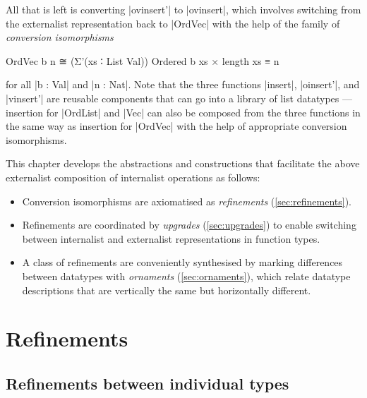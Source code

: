 All that is left is converting |ovinsert'| to |ovinsert|, which involves switching from the externalist representation back to |OrdVec| with the help of the family of \emph{conversion isomorphisms}
\begin{code}
OrdVec b n ≅ (Σ'(xs ∶ List Val)) Ordered b xs × length xs ≡ n
\end{code}
for all |b : Val| and |n : Nat|.
Note that the three functions |insert|, |oinsert'|, and |vinsert'| are reusable components that can go into a library of list datatypes --- insertion for |OrdList| and |Vec| can also be composed from the three functions in the same way as insertion for |OrdVec| with the help of appropriate conversion isomorphisms.

This chapter develops the abstractions and constructions that facilitate the above externalist composition of internalist operations as follows:
\begin{itemize}
\item Conversion isomorphisms are axiomatised as \emph{refinements} (\autoref{sec:refinements}).
\item Refinements are coordinated by \emph{upgrades} (\autoref{sec:upgrades}) to enable switching between internalist and externalist representations in function types.
\item A class of refinements are conveniently synthesised by marking differences between datatypes with \emph{ornaments} (\autoref{sec:ornaments}), which relate datatype descriptions that are vertically the same but horizontally different.
\end{itemize}


\section{Refinements}
\label{sec:refinements}

\subsection{Refinements between individual types}
\label{sec:individual-refinements}


